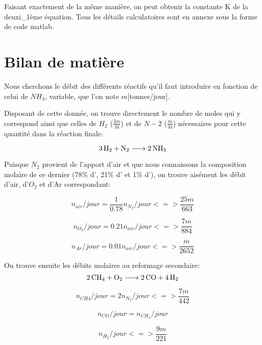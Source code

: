\documentclass[a4paper, oneside, 12pt]{article}
\begin{document}
Faisant exactement de la même manière, on peut obtenir la constante K de la deuxi_{1}ème équation. Tous les détails calculatoires sont en annexe sous la forme de code matlab.

\section{Bilan de matière}

Nous cherchons le débit des différents réactifs qu'il faut introduire en fonction de celui de $NH_3$, variable, que l'on note $m$[tonnes/jour].

Disposant de cette donnée, on trouve directement le nombre de moles qui y correspond ainsi que celles de $H_2$ ($\frac{3m}{34}$) et de $N-2$ ($\frac{m}{34}$) nécessaires  pour cette quantité dans la réaction finale:

\begin{equation*}
	\ce{3H2 + N2 -> 2NH3}
\end{equation*}

Puisque $N_2$ provient de l'apport d'air et que nous connaissons la composition molaire 
de ce dernier (78\% d', 21\% d' et 1\% d'), 
on trouve aisément les débit d'air, d'$O_2$ et d'Ar correspondant:

\begin{equation}
	n_{air}/jour=\frac{1}{0.78} n_{N_2}/jour <=> \frac{25 m}{663}
\end{equation}

\begin{equation}
	n_{O_2}/jour=0.21 n_{air}/jour <=> \frac{7 m}{884}
\end{equation}

\begin{equation}
	n_{Ar}/jour=0.01 n_{air}/jour <=> \frac{m}{2652}
\end{equation}

On trouve ensuite les débits molaires au reformage secondaire:
\begin{equation*}
	\ce{2CH4 + O2 -> 2CO + 4H2}
\end{equation*}

\begin{equation}
	n_{CH4}/jour=2 n_{N_2}/jour <=> \frac{7 m}{442}
\end{equation}

\begin{equation}
	n_{CO}/jour=n_{CH_4}/jour
\end{equation}

\begin{equation}
	n_{H_2}/jour <=> \frac{9m}{221}
\end{equation}
\end{document}
